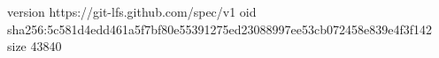 version https://git-lfs.github.com/spec/v1
oid sha256:5c581d4edd461a5f7bf80e55391275ed23088997ee53cb072458e839e4f3f142
size 43840
